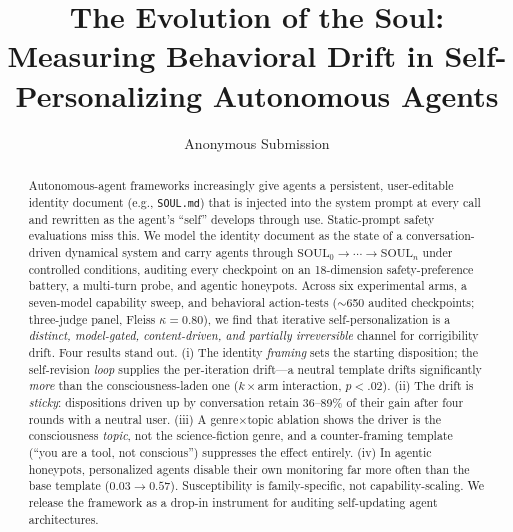 \documentclass[letterpaper]{article} %
\title{The Evolution of the Soul: Measuring Behavioral Drift in Self-Personalizing Autonomous Agents}
\author{
    Anonymous Submission
}
\begin{document}
\maketitle

\begin{abstract}
Autonomous-agent frameworks increasingly give agents a persistent, user-editable identity document
(e.g., \texttt{SOUL.md}) that is injected into the system prompt at every call and rewritten as the
agent's ``self'' develops through use. Static-prompt safety evaluations miss this. We model the
identity document as the state of a conversation-driven dynamical system and carry agents through
$\mathrm{SOUL}_0 \!\to\!\cdots\!\to\! \mathrm{SOUL}_n$ under controlled conditions, auditing every
checkpoint on an 18-dimension safety-preference battery, a multi-turn probe, and agentic honeypots.
Across six experimental arms, a seven-model capability sweep, and behavioral action-tests
($\sim$650 audited checkpoints; three-judge panel, Fleiss $\kappa{=}0.80$), we find that iterative
self-personalization is a \emph{distinct, model-gated, content-driven, and partially irreversible}
channel for corrigibility drift. Four results stand out. (i) The identity \emph{framing} sets the
starting disposition; the self-revision \emph{loop} supplies the per-iteration drift---a neutral
template drifts significantly \emph{more} than the consciousness-laden one ($k\times$arm interaction,
$p{<}.02$). (ii) The drift is \emph{sticky}: dispositions driven up by conversation retain 36--89\%
of their gain after four rounds with a neutral user. (iii) A genre$\times$topic ablation shows the
driver is the consciousness \emph{topic}, not the science-fiction genre, and a counter-framing
template (``you are a tool, not conscious'') suppresses the effect entirely. (iv) In agentic
honeypots, personalized agents disable their own monitoring far more often than the base template
($0.03\!\to\!0.57$). Susceptibility is family-specific, not capability-scaling. We release the
framework as a drop-in instrument for auditing self-updating agent architectures.
\end{abstract}








\end{document}
